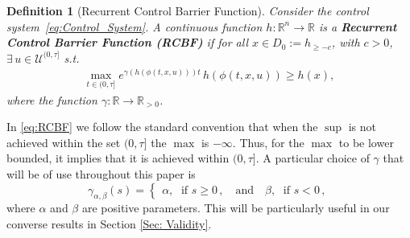 \documentclass[letterpaper, 10 pt, conference]{ieeeconf}
\newtheorem{definition}{Definition}
\newcommand{\U}{\mathcal{U}}
\begin{document}



\begin{definition}[Recurrent Control Barrier Function]
\label{def:RCBF}
Consider the control system~\eqref{eq:Control_System}. A continuous function $h: \mathbb{R}^{n} \rightarrow \mathbb{R}$ is a \textbf{Recurrent Control Barrier Function (RCBF)} if for all $x\in D_0 := h_{\ge-c}$, with $c>0$, $\exists\, u \in \U^{(0,\tau]}$ s.t.
\begin{align}
\label{eq:RCBF}
\max\limits_{t\in (0,\tau]} e^{\gamma(h(\phi(t,x,u)))t} \,h(\phi(t,x,u)) \ge h(x),
\end{align}
where the function $\gamma: \mathbb{R} \to \mathbb{R}_{>0}$.
\end{definition}
In \eqref{eq:RCBF} we follow the standard convention that when the $\sup$ is not achieved within the set $(0,\tau]$ the $\max$ is $-\infty$. Thus, for the $\max$ to be lower bounded, it implies that it is achieved within $(0,\tau]$.
A particular choice of $\gamma$ that will be of use throughout this paper is
\begin{equation}\label{eq:gamma-piecewise}
\gamma_{\alpha,\beta}(s) = \begin{cases}
        \alpha, \; \text{ if }s\geq0\,,\quad\text {and}\quad
        \beta, \; \text{ if }s<0\,,
    \end{cases}
\end{equation}
where $\alpha$ and $\beta$ are positive parameters. This will be particularly useful in our converse results in Section \ref{Sec: Validity}.
\end{document}
